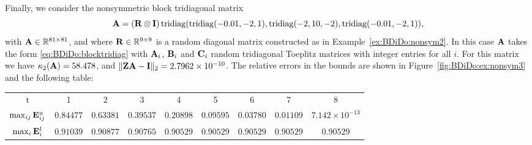 \begin{example}\label{ex:BDiDo:nonsym3}{\textrm
Finally, we consider the nonsymmetric block tridiagonal matrix
\begin{equation*}
\mathbf{A}=\\(\mathbf{R}\otimes \mathbf{I})\operatorname{tridiag}(\operatorname{tridiag}(-0.01,-2,1),\operatorname{tridiag}(-2,10,-2),\operatorname{tridiag}(-0.01,-2,1)),
\end{equation*}
with $\mathbf{A}\in\mathbb{R}^{81\times 81}$, and where $\mathbf{R}\in\mathbb{R}^{9\times 9}$
is a random diagonal matrix constructed as in
\textnormal{Example~\ref{ex:BDiDo:nonsym2}}.
In this case $\mathbf{A}$ takes the form \eqref{eq:BDiDo:blocktridiag} with $\mathbf{A}_i$,
$\mathbf{B}_i$ and $\mathbf{C}_i$ random tridiagonal Toeplitz matrices with integer entries
for all $i$. For this matrix we have $\kappa_2(\mathbf{A})=58.478$, and
$\|\mathbf{Z}\mathbf{A}-\mathbf{I}\|_2=2.7962\times 10^{-10}$. The relative errors in the bounds
are shown in \textnormal{Figure~\ref{fig:BDiDo:ex:nonsym3}} and the following
table:
%
\begin{table}[h!]\scriptsize\centering
\begin{tabular}{c c c c c c c c c}
\hline
 t & 1 & 2 & 3 & 4 & 5 & 6 & 7 & 8 \\
 $\max_{ij}\mathbf{E}^{u}_{ij}$ &  $0.84477$ & $0.63381$ & $0.39537$ & $0.20898$ & $0.09595$ & $0.03780$ &  $0.01109$ & $7.142\times 10^{-13}$\\
 $\max_{i}\mathbf{E}^{l}_{i}$ &  $0.91039$ & $0.90877$ & $0.90765$ & $0.90529$ & $0.90529$ & $0.90529$ &  $0.90529$ & $0.90529$\\
  \hline
\end{tabular}
\end{table}
%
\vspace*{2em}
\begin{figure}[h!]
\hspace{-1cm}

\end{figure}}
\end{example}
